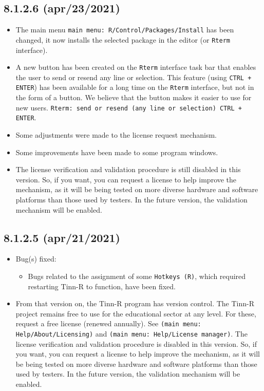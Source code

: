 \subsection*{8.1.2.6 (apr/23/2021)}
\begin{itemize}
  \item The main menu \texttt{main menu: R/Control/Packages/Install}
     has been changed, it now installs the selected package in the editor
     (or \texttt{Rterm} interface).
  \item A new button has been created on the \texttt{Rterm} interface task bar that enables the user
    to send or resend any line or selection. This feature (using \texttt{CTRL + ENTER}) has been available for
    a long time on the \texttt{Rterm} interface, but not in the form of a button. We believe that the button
    makes it easier to use for new users. \texttt{Rterm: send or resend (any line or selection) CTRL + ENTER}.
  \item Some adjustments were made to the license request mechanism.
  \item Some improvements have been made to some program windows.
  \item The license verification and validation procedure is still disabled in this version.
    So, if you want, you can request a license to help improve the mechanism,
    as it will be being tested on more diverse hardware and software platforms than
    those used by testers. In the future version, the validation mechanism will be enabled.
\end{itemize}

\subsection*{8.1.2.5 (apr/21/2021)}
\begin{itemize}
  \item Bug(s) fixed:
    \begin{itemize}
      \item Bugs related to the assignment of some \texttt{Hotkeys (R)}, which required restarting
        Tinn-R to function, have been fixed.
    \end{itemize}
  \item From that version on, the Tinn-R program has version control.
    The Tinn-R project remains free to use for the educational sector
    at any level. For these, request a free license (renewed annually).
    See \texttt{(main menu: Help/About/Licensing)} and \texttt{(main menu: Help/License manager)}.
    The license verification and validation procedure is disabled in this version.
    So, if you want, you can request a license to help improve the mechanism,
    as it will be being tested on more diverse hardware and software platforms than
    those used by testers. In the future version, the validation mechanism will be enabled.
\end{itemize}

